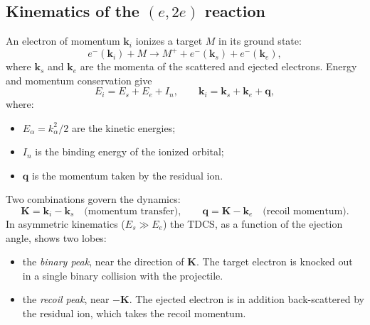 \documentclass[11pt,a4paper]{article}
\newcommand{\bk}{\mathbf k}
\begin{document}
\subsection{Kinematics of the $(e,2e)$ reaction}
An electron of momentum $\bk_i$ ionizes a target $M$ in its ground state:
\begin{equation}
e^-(\bk_i)+M\longrightarrow M^++e^-(\bk_s)+e^-(\bk_e),
\end{equation}
where $\bk_s$ and $\bk_e$ are the momenta of the scattered and ejected electrons.
Energy and momentum conservation give
\begin{equation}
E_i=E_s+E_e+I_n,\qquad \bk_i=\bk_s+\bk_e+\mathbf q,
\end{equation}
where:
\begin{itemize}
\item $E_\alpha=k_\alpha^2/2$ are the kinetic energies;
\item $I_n$ is the binding energy of the ionized orbital;
\item $\mathbf q$ is the momentum taken by the residual ion.
\end{itemize}
Two combinations govern the dynamics:
\begin{equation}
\mathbf K=\bk_i-\bk_s \quad\text{(momentum transfer)},\qquad
\mathbf q=\mathbf K-\bk_e\quad\text{(recoil momentum)} .
\end{equation}
In asymmetric kinematics ($E_s\gg E_e$) the TDCS, as a function of the ejection angle, shows two
lobes:
\begin{itemize}
\item the \emph{binary peak}, near the direction of $\mathbf K$. The target electron is knocked
  out in a single binary collision with the projectile.
\item the \emph{recoil peak}, near $-\mathbf K$. The ejected electron is in addition
  back-scattered by the residual ion, which takes the recoil momentum.
\end{itemize}
\end{document}
